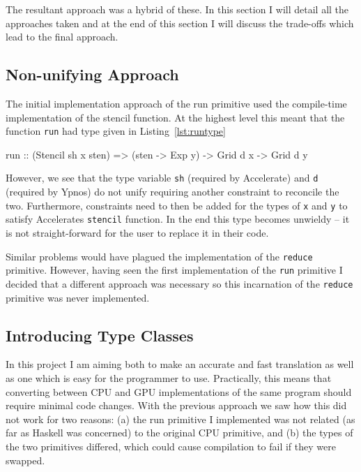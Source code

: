 \documentclass[12pt,a4paper,twoside]{scrbook}
\begin{document}
The resultant approach was a hybrid of these. In this section I will detail all
the approaches taken and at the end of this section I will discuss the
trade-offs which lead to the final approach.

\subsection{Non-unifying Approach}
\label{sec:non-unify-appr}

The initial implementation approach of the run primitive used the compile-time
implementation of the stencil function. At the highest level this meant that the
function \texttt{run} had type given in Listing~\ref{lst:runtype}

\begin{hflisting}[label={lst:runtype}, caption=The type of run required by Accelerate.]
run :: (Stencil sh x sten) =>
       (sten -> Exp y) -> Grid d x -> Grid d y
\end{hflisting}

However, we see that the type variable \texttt{sh} (required by Accelerate) and
\texttt{d} (required by Ypnos) do not unify requiring another constraint to
reconcile the two. Furthermore, constraints need to then be added for the types
of \texttt{x} and \texttt{y} to satisfy Accelerates \texttt{stencil}
function. In the end this type becomes unwieldy -- it is not straight-forward
for the user to replace it in their code.

Similar problems would have plagued the implementation of the \texttt{reduce}
primitive. However, having seen the first implementation of the \texttt{run}
primitive I decided that a different approach was necessary so this incarnation
of the \texttt{reduce} primitive was never implemented.

\subsection{Introducing Type Classes}

In this project I am aiming both to make an accurate and fast translation as
well as one which is easy for the programmer to use.  Practically, this means
that converting between CPU and GPU implementations of the same program should
require minimal code changes.  With the previous approach we saw how this did
not work for two reasons: (a) the run primitive I implemented was not related
(as far as Haskell was concerned) to the original CPU primitive, and (b) the
types of the two primitives differed, which could cause compilation to fail if
they were swapped.
\end{document}
